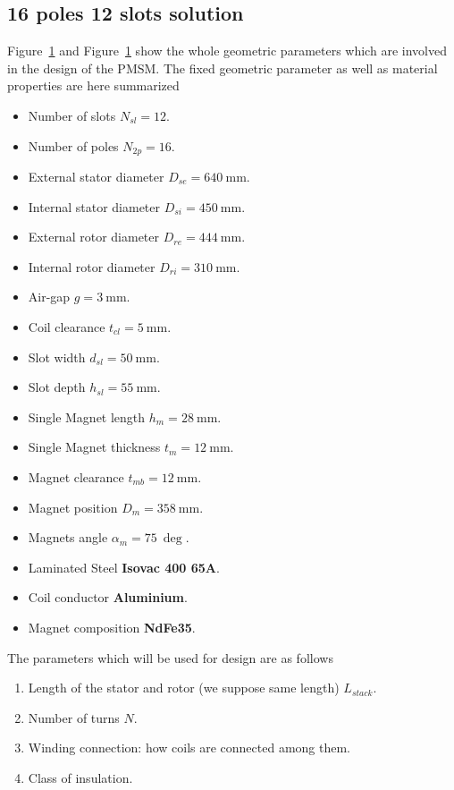 \documentclass[11pt,a4paper,oneside]{book}
\begin{document}
\begin{onehalfspace}
\section{16 poles 12 slots solution}
Figure~\ref{} and Figure~\ref{} show the whole geometric parameters which are involved in the design of the PMSM. The fixed geometric parameter as well as material properties are here summarized
\begin{itemize}
	\item Number of slots $N_{sl}=12$.	
	\item Number of poles $N_{2p}=16$.
	\item External stator diameter $D_{se}=\SI{640}{\milli\meter}$.
	\item Internal stator diameter $D_{si}=\SI{450}{\milli\meter}$.
	\item External rotor diameter $D_{re}=\SI{444}{\milli\meter}$.
	\item Internal rotor diameter $D_{ri}=\SI{310}{\milli\meter}$.
	\item Air-gap $g=\SI{3}{\milli\meter}$.
	\item Coil clearance $t_{cl}=\SI{5}{\milli\meter}$.
	\item Slot width $d_{sl}=\SI{50}{\milli\meter}$.
	\item Slot depth $h_{sl}=\SI{55}{\milli\meter}$.
	\item Single Magnet length $h_{m}=\SI{28}{\milli\meter}$.
	\item Single Magnet thickness $t_{m}=\SI{12}{\milli\meter}$.
	\item Magnet clearance $t_{mb}=\SI{12}{\milli\meter}$.
	\item Magnet position $D_{m}=\SI{358}{\milli\meter}$.
	\item Magnets angle $\alpha_{m}=\SI{75}{\deg}$.
	\item Laminated Steel \textbf{Isovac 400 65A}.
	\item Coil conductor \textbf{Aluminium}.
	\item Magnet composition \textbf{NdFe35}.
\end{itemize}
The parameters which will be used for design are as follows
\begin{enumerate}
	\item Length of the stator and rotor (we suppose same length) $L_{stack}$.
	\item Number of turns $N$.
	\item Winding connection: how coils are connected among them.
	\item Class of insulation.
\end{enumerate}



\end{onehalfspace}
\end{document}
